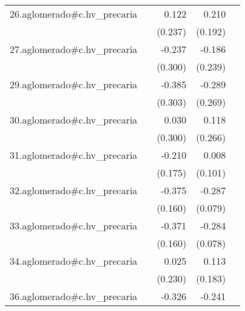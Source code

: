 {\begin{longtable}{l*{4}{D{.}{.}{-1}}}
\addlinespace
26.aglomerado#c.hv\_precaria&                     &       0.122         &       0.210         &                     \\
            &                     &     (0.237)         &     (0.192)         &                     \\
\addlinespace
27.aglomerado#c.hv\_precaria&                     &      -0.237         &      -0.186         &                     \\
            &                     &     (0.300)         &     (0.239)         &                     \\
\addlinespace
29.aglomerado#c.hv\_precaria&                     &      -0.385         &      -0.289         &                     \\
            &                     &     (0.303)         &     (0.269)         &                     \\
\addlinespace
30.aglomerado#c.hv\_precaria&                     &       0.030         &       0.118         &                     \\
            &                     &     (0.300)         &     (0.266)         &                     \\
\addlinespace
31.aglomerado#c.hv\_precaria&                     &      -0.210         &       0.008         &                     \\
            &                     &     (0.175)         &     (0.101)         &                     \\
\addlinespace
32.aglomerado#c.hv\_precaria&                     &      -0.375\sym{*}  &      -0.287\sym{***}&                     \\
            &                     &     (0.160)         &     (0.079)         &                     \\
\addlinespace
33.aglomerado#c.hv\_precaria&                     &      -0.371\sym{*}  &      -0.284\sym{***}&                     \\
            &                     &     (0.160)         &     (0.078)         &                     \\
\addlinespace
34.aglomerado#c.hv\_precaria&                     &       0.025         &       0.113         &                     \\
            &                     &     (0.230)         &     (0.183)         &                     \\
\addlinespace
36.aglomerado#c.hv\_precaria&                     &      -0.326         &      -0.241\sym{*}  &                     \\

\end{longtable}}
